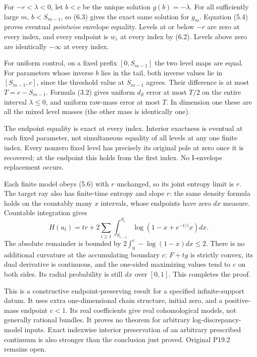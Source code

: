 \documentclass[
  11pt,
]{article}
\begin{document}
For \(-r<\lambda<0\), let \(b<c\) be the unique solution
\(g(b)=-\lambda\). For all sufficiently large \(m\), \(b<S_{m-1}\), so
(6.3) gives the exact same solution for \(g_m\). Equation (5.4) proves
eventual \emph{pointwise} envelope equality. Levels at or below \(-r\)
are zero at every index, and every endpoint is \(w_c\) at every index by
(6.2). Levels above zero are identically \(-\infty\) at every index.

For uniform control, on a fixed prefix \([0,S_{m-1}]\) the two level
maps are equal. For parameters whose inverse \(b\) lies in the tail,
both inverse values lie in \([S_{m-1},c]\), since the threshold value at
\(S_{m-1}\) agrees. Their difference is at most \(T=c-S_{m-1}\). Formula
(3.2) gives uniform \(d_{\mathcal S}\) error at most \(T/2\) on the
entire interval \(\lambda\leq0\), and uniform raw-mass error at most
\(T\). In dimension one these are all the mixed level masses (the other
mass is identically one).

The endpoint equality is exact at every index. Interior exactness is
eventual at each fixed parameter, not simultaneous equality of all
levels at any one finite index. Every nonzero fixed level has precisely
its original pole at zero once it is recovered; at the endpoint this
holds from the first index. No I-envelope replacement occurs.

Each finite model obeys (5.6) with \(r\) unchanged, so its joint entropy
limit is \(r\). The target ray also has finite-time entropy and slope
\(r\): the same density formula holds on the countably many \(x\)
intervals, whose endpoints have zero \(dx\) measure. Countable
integration gives \[ H(u_t)=tr+2\sum_{i\geq1}\int_{S_{i-1}}^{S_i}
                         \log(1-x+e^{-t/i}x)dx.\] The absolute remainder
is bounded by \(2\int_0^c-\log(1-x)dx\leq2\). There is no additional
curvature at the accumulating boundary \(c\): \(F+tg\) is strictly
convex, its dual derivative is continuous, and the one-sided maximizing
values tend to \(c\) on both sides. Its radial probability is still
\(dx\) over \([0,1]\). This completes the proof.

This is a constructive endpoint-preserving result for a specified
infinite-support datum. It uses extra one-dimensional chain structure,
initial zero, and a positive-mass endpoint \(c<1\). Its real
coefficients give real cohomological models, not generally rational
bundles. It proves no theorem for arbitrary log-discrepancy-model
inputs. Exact indexwise interior preservation of an arbitrary prescribed
continuum is also stronger than the conclusion just proved. Original
P19.2 remains open.
\end{document}
